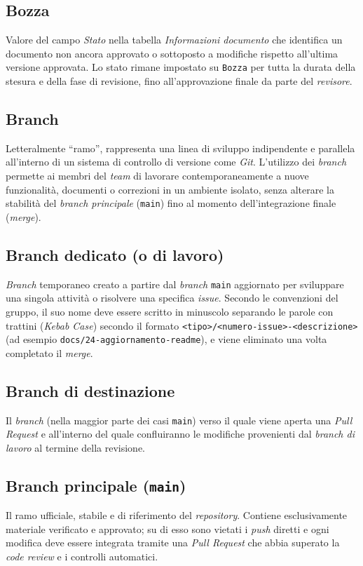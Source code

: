 \documentclass[11pt, a4paper]{article}
\begin{document}
\subsection*{Bozza}
Valore del campo \textit{Stato} nella tabella \textit{Informazioni documento} che identifica un documento non ancora approvato o sottoposto a modifiche rispetto all'ultima versione approvata. Lo stato rimane impostato su \texttt{Bozza} per tutta la durata della stesura e della fase di revisione, fino all'approvazione finale da parte del \textit{revisore}.

\subsection*{Branch}
Letteralmente ``ramo'', rappresenta una linea di sviluppo indipendente e parallela all'interno di un sistema di controllo di versione come \textit{Git}. L'utilizzo dei \textit{branch} permette ai membri del \textit{team} di lavorare contemporaneamente a nuove funzionalità, documenti o correzioni in un ambiente isolato, senza alterare la stabilità del \textit{branch principale} (\texttt{main}) fino al momento dell'integrazione finale (\textit{merge}).

\subsection*{Branch dedicato (o di lavoro)}
\textit{Branch} temporaneo creato a partire dal \textit{branch} \texttt{main} aggiornato per sviluppare una singola attività o risolvere una specifica \textit{issue}. Secondo le convenzioni del gruppo, il suo nome deve essere scritto in minuscolo separando le parole con trattini (\textit{Kebab Case}) secondo il formato \texttt{<tipo>/<numero-issue>-<descrizione>} (ad esempio \texttt{docs/24-aggiornamento-readme}), e viene eliminato una volta completato il \textit{merge}.

\subsection*{Branch di destinazione}
Il \textit{branch} (nella maggior parte dei casi \texttt{main}) verso il quale viene aperta una \textit{Pull Request} e all'interno del quale confluiranno le modifiche provenienti dal \textit{branch di lavoro} al termine della revisione.

\subsection*{Branch principale (\texttt{main})}
Il ramo ufficiale, stabile e di riferimento del \textit{repository}. Contiene esclusivamente materiale verificato e approvato; su di esso sono vietati i \textit{push} diretti e ogni modifica deve essere integrata tramite una \textit{Pull Request} che abbia superato la \textit{code review} e i controlli automatici.
\end{document}

